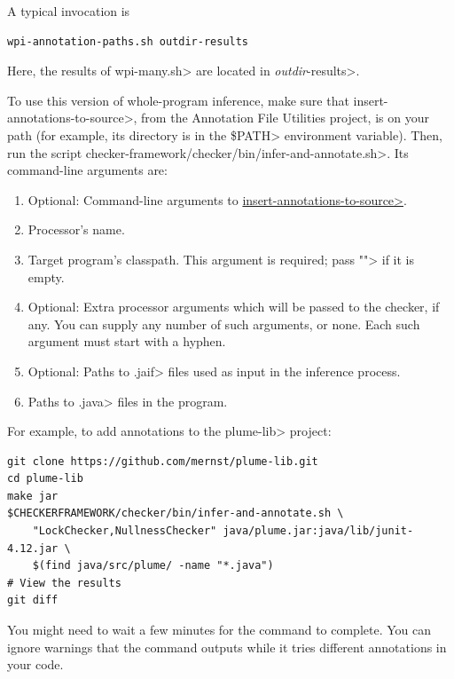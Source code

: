 A typical invocation is

\begin{Verbatim}
wpi-annotation-paths.sh outdir-results
\end{Verbatim}

Here, the results of \<wpi-many.sh> are located in \<\emph{outdir}-results>.


\begin{sloppypar}
To use this version of whole-program inference, make sure that
\<insert-annotations-to-source>, from the Annotation File Utilities project,
is on your path (for example, its directory is in the \<\$PATH> environment variable).
Then, run the script \<checker-framework/checker/bin/infer-and-annotate.sh>.
Its command-line arguments are:
\end{sloppypar}

\begin{enumerate}
\item Optional: Command-line arguments to
  \href{https://checkerframework.org/annotation-file-utilities/#insert-annotations-to-source}{\<insert-annotations-to-source>}.
\item Processor's name.
\item Target program's classpath.  This argument is required; pass \<""> if it
  is empty.
\item Optional: Extra processor arguments which will be passed to the checker, if any.
  You can supply any number of such arguments, or none.  Each such argument
  must start with a hyphen.
\item Optional: Paths to \<.jaif> files used as input in the inference
    process.
\item Paths to \<.java> files in the program.
\end{enumerate}

For example, to add annotations to the \<plume-lib> project:
\begin{Verbatim}
git clone https://github.com/mernst/plume-lib.git
cd plume-lib
make jar
$CHECKERFRAMEWORK/checker/bin/infer-and-annotate.sh \
    "LockChecker,NullnessChecker" java/plume.jar:java/lib/junit-4.12.jar \
    $(find java/src/plume/ -name "*.java")
# View the results
git diff
\end{Verbatim}

You might need to wait a few minutes for the command to complete.
You can ignore warnings that the command outputs while it tries different
annotations in your code.

